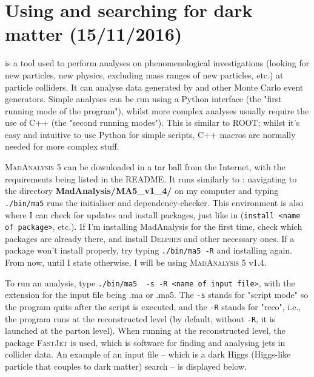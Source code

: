 \newpage
\chapter{Using \madanalysis and searching for dark matter (15/11/2016)}

\madanalysis is a tool used to perform analyses on phenomenological investigations (looking for new particles, new physics, excluding mass ranges of new particles, etc.) at particle colliders. It can analyse data generated by \madgraph and other Monte Carlo event generators. Simple analyses can be run using a Python interface (the "first running mode of the program"), whilst more complex analyses usually require the use of C++ (the "second running modes"). This is similar to ROOT; whilst it's easy and intuitive to use Python for simple scripts, C++ macros are normally needed for more complex stuff.

\textsc{MadAnalysis 5} \cite{Conte:2012madanalysis} can be downloaded in a tar ball from the Internet, with the requirements being listed in the README. It runs similarly to \madgraph: navigating to the directory \textbf{MadAnalysis/MA5\_v1\_4/} on my computer and typing \verb!./bin/ma5! runs the initialiser and dependency-checker. This environment is also where I can check for updates and install packages, just like in \madgraph (\verb!install <name of package>!, etc.). If I'm installing MadAnalysis for the first time, check which packages are already there, and install \textsc{Delphes} and other necessary ones. If a package won't install properly, try typing \verb!./bin/ma5 -R! and installing again. From now, until I state otherwise, I will be using \textsc{MadAnalysis 5} v1.4.

To run an analysis, type \verb!./bin/ma5  -s -R <name of input file>!, with the extension for the input file being .ma or .ma5. The \verb!-s! stands for "script mode" so the program quits after the script is executed, and the \verb!-R! stands for "reco", i.e., the program runs at the reconstructed level (by default, without \verb!-R!, it is launched at the parton level). When running at the reconstructed level, the package \textsc{FastJet} \cite{Cacciari:2011fastjet} is used, which is software for finding and analysing jets in collider data. An example of an input file -- which is a dark Higgs (Higgs-like particle that couples to dark matter) search -- is displayed below.



